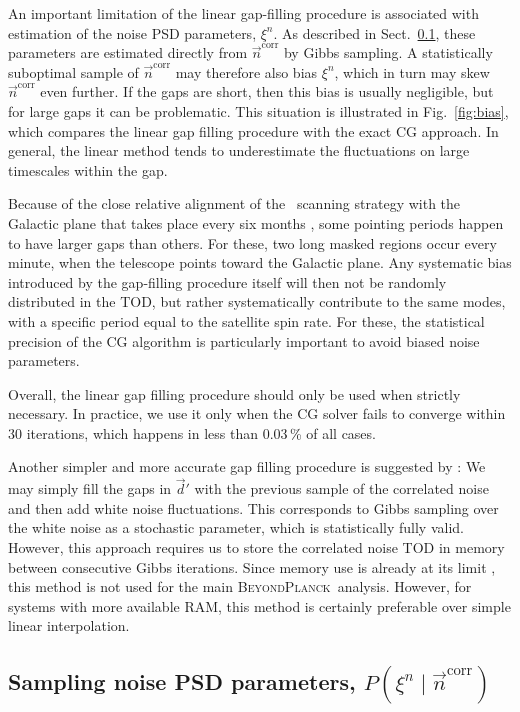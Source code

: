 \documentclass{aa}
\renewcommand{\d}[0]{\vec{d}}
\newcommand{\BP}{\textsc{BeyondPlanck}}
\begin{document}
An important limitation of the linear gap-filling procedure is
associated with estimation of the noise PSD parameters, $\xi^n$. As
described in Sect.~\ref{sec:noise_psd}, these parameters are estimated
directly from $\vec{n}^\mathrm{corr}$ by Gibbs sampling. A
statistically suboptimal sample of $\vec{n}^\mathrm{corr}$ may
therefore also bias $\xi^n$, which in turn may skew
$\vec{n}^\mathrm{corr}$ even further. If the gaps are short, then this
bias is usually negligible, but for large gaps it can be
problematic. This situation is illustrated in Fig.~\ref{fig:bias},
which compares the linear gap filling procedure with the exact CG
approach. In general, the linear method tends to underestimate the
fluctuations on large timescales within the gap.

Because of the close relative alignment of the \Planck\ scanning
strategy with the Galactic plane that takes place every six
months \citep{planck2011-1.1}, some pointing periods happen to have larger gaps than
others. For these, two long masked regions occur every minute, when
the telescope points toward the Galactic plane. Any systematic bias
introduced by the gap-filling procedure itself will then not be
randomly distributed in the TOD, but rather systematically contribute
to the same modes, with a specific period equal to the satellite spin
rate. For these, the statistical precision of the CG algorithm is
particularly important to avoid biased noise parameters.

Overall, the linear gap filling procedure should only be used when
strictly necessary. In practice, we use it only when the CG solver
fails to converge within 30 iterations, which happens in less
than 0.03\,\% of all cases.

Another simpler and more accurate gap filling procedure is suggested
by \citet{bp02}: We may simply fill the gaps in $\d'$ with the
previous sample of the correlated noise and then add white noise
fluctuations.  This corresponds to Gibbs sampling over the white noise
as a stochastic parameter, which is statistically fully valid. However,
this approach requires us to store the correlated noise TOD in memory
between consecutive Gibbs iterations. Since memory use is already at
its limit \citep{bp03}, this method is not used for the main
\BP\ analysis. However, for systems with more available RAM, this
method is certainly preferable over simple linear interpolation.

\subsection{Sampling noise PSD parameters, $P(\xi^n\mid\vec{n}^\mathrm{corr})$}
\label{sec:noise_psd}
\end{document}
